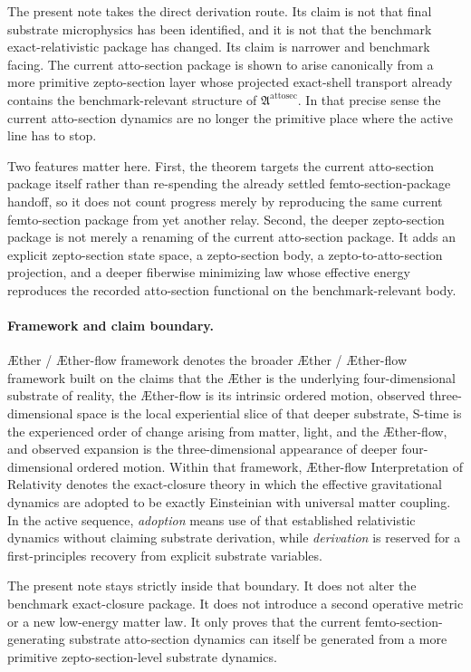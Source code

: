 \documentclass[11pt]{article}
\newcommand{\Aether}{\AE{}ther}
\newcommand{\Aflow}{\AE{}ther-flow}
\newcommand{\TheoryName}{\Aflow{} Interpretation of Relativity}
\newcommand{\TheoryProgram}{\Aether{} / \Aflow{} framework}
\newcommand{\AttoSectionPackage}{\mathfrak A^{\mathrm{attosec}}}
\begin{document}
The present note takes the direct derivation route. Its claim is not that final substrate microphysics has been identified, and it is not that the benchmark exact-relativistic package has changed. Its claim is narrower and benchmark facing. The current atto-section package is shown to arise canonically from a more primitive zepto-section layer whose projected exact-shell transport already contains the benchmark-relevant structure of \(\AttoSectionPackage\). In that precise sense the current atto-section dynamics are no longer the primitive place where the active line has to stop.

Two features matter here. First, the theorem targets the current atto-section package itself rather than re-spending the already settled femto-section-package handoff, so it does not count progress merely by reproducing the same current femto-section package from yet another relay. Second, the deeper zepto-section package is not merely a renaming of the current atto-section package. It adds an explicit zepto-section state space, a zepto-section body, a zepto-to-atto-section projection, and a deeper fiberwise minimizing law whose effective energy reproduces the recorded atto-section functional on the benchmark-relevant body.

\paragraph{Framework and claim boundary.}
\TheoryProgram{} denotes the broader \Aether{} / \Aflow{} framework built on the claims that the \Aether{} is the underlying four-dimensional substrate of reality, the \Aflow{} is its intrinsic ordered motion, observed three-dimensional space is the local experiential slice of that deeper substrate, S-time is the experienced order of change arising from matter, light, and the \Aflow{}, and observed expansion is the three-dimensional appearance of deeper four-dimensional ordered motion. Within that framework, \TheoryName{} denotes the exact-closure theory in which the effective gravitational dynamics are adopted to be exactly Einsteinian with universal matter coupling. In the active sequence, \emph{adoption} means use of that established relativistic dynamics without claiming substrate derivation, while \emph{derivation} is reserved for a first-principles recovery from explicit substrate variables.

The present note stays strictly inside that boundary. It does not alter the benchmark exact-closure package. It does not introduce a second operative metric or a new low-energy matter law. It only proves that the current femto-section-generating substrate atto-section dynamics can itself be generated from a more primitive zepto-section-level substrate dynamics.
\end{document}
